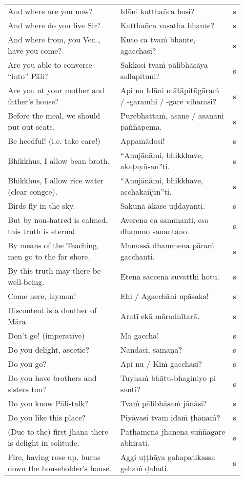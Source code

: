 \documentclass[a5paper]{memoir}
\begin{document}
\begin{longtable}{L{0.48\linewidth} L{0.48\linewidth} H}
And where are you now? & Idāni katthañca hosi? & s\\[0pt]
And where do you live Sir? & Katthañca vasatha bhante? & s\\[0pt]
And where from, you Ven., have you come? & Kuto ca tvaṁ bhante, āgacchasi? & s\\[0pt]
Are you able to converse ``into'' Pāli? & Sakkosi tvaṁ pālibhāsāya sallapituṁ? & s\\[0pt]
Are you at your mother and father's house? & Api nu Idāni mātāpitūgāraṁ / -garamhi / -gare viharasi? & s\\[0pt]
Before the meal, we should put out seats. & Purebhattaṁ, āsane / āsanāni paññāpema. & s\\[0pt]
Be heedful! (i.e. take care!) & Appamādosi! & s\\[0pt]
Bhikkhus, I allow bean broth. & ``Anujānāmi, bhikkhave, akaṭayūsan''ti. & s\\[0pt]
Bhikkhus, I allow rice water (clear congee). & ``Anujānāmi, bhikkhave, acchakañjin''ti. & s\\[0pt]
Birds fly in the sky. & Sakuṇā ākāse uḍḍayanti. & s\\[0pt]
But by non-hatred is calmed, this truth is eternal. & Averena ca sammanti, esa dhammo sanantano. & s\\[0pt]
By means of the Teaching, men go to the far shore. & Manussā dhammena pāraṁ gacchanti. & s\\[0pt]
By this truth may there be well-being. & Etena saccena suvatthi hotu. & s\\[0pt]
Come here, layman! & Ehi / Āgacchāhi upāsaka! & s\\[0pt]
Discontent is a dauther of Māra. & Aratī ekā māradhītarā. & s\\[0pt]
Don't go! (imperative) & Mā gaccha! & s\\[0pt]
Do you delight, ascetic? & Nandasi, samaṇa? & s\\[0pt]
Do you go? & Api nu / Kiṁ gacchasi? & s\\[0pt]
Do you have brothers and sisters too? & Tuyhaṁ bhātu-bhaginiyo pi santi? & s\\[0pt]
Do you know Pāli-talk? & Tvaṁ pālibhāsaṁ jānāsi? & s\\[0pt]
Do you like this place? & Piyāyasi tvam idaṁ ṭhānaṁ? & s\\[0pt]
(Due to the) first jhāna there is delight in solitude. & Paṭhamena jhānena suññāgāre abhirati. & s\\[0pt]
Fire, having rose up, burns down the householder's house. & Aggi uṭṭhāya gahapatikassa gehaṁ ḍahati. & s\\[0pt]

\end{longtable}
\end{document}
